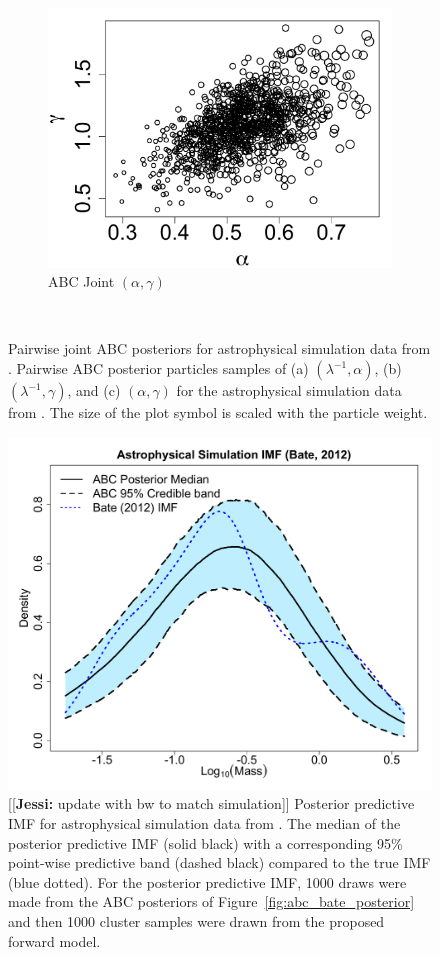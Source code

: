 \documentclass[12pt]{article}
\newcommand{\jessi}[1]{{\color{blue}[[\textbf{Jessi: }#1]]}}
\begin{document}
\begin{figure}[htbp]
\begin{subfigure}{0.32\textwidth}
\centering
\includegraphics[width = \textwidth]{figures/bate_joint_alpha_gamma.pdf} 
\caption{ABC Joint $(\alpha, \gamma)$}\label{subfig:joint_gamma_alpha_bate}
\end{subfigure} \\
\caption{
Pairwise joint ABC posteriors for astrophysical simulation data from \cite{Bate2012}.  Pairwise ABC posterior particles samples of (a) $(\lambda^{-1}, \alpha)$, (b) $(\lambda^{-1}, \gamma)$, and (c) $(\alpha, \gamma)$ for the astrophysical simulation data from \cite{Bate2012}.  The size of the plot symbol is scaled with the particle weight.
}
\label{fig:abc_bate_joints}
\end{figure}





\begin{figure}[htbp]
\centering
\includegraphics[width=.5\textwidth]{figures/bate_pred_imf.pdf}
 \caption{\jessi{update with bw to match simulation}  Posterior predictive IMF for astrophysical simulation data from \cite{Bate2012}. 
The median of the posterior predictive IMF (solid black) with a corresponding 95\% point-wise predictive band (dashed black) compared to the true IMF (blue dotted).  For the posterior predictive IMF, 1000 draws were made from the ABC posteriors of Figure~\ref{fig:abc_bate_posterior} and then 1000 cluster samples were drawn from the proposed forward model.  
} \label{fig:abc_bate_pred}
\end{figure}
\end{document}
